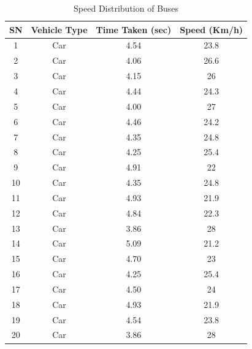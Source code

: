 \begin{table}[h!]
    \centering
    \caption{Speed Distribution of Buses}
    \begin{tabular}{|c|c|c|c|}
        \hline
        \textbf{SN}	& \textbf{Vehicle Type}	& \textbf{Time Taken (sec)}	& \textbf{Speed (Km/h)} \\ \hline
        1	&Car	&4.54	&23.8 \\ \hline
        2	&Car	&4.06	&26.6 \\ \hline
        3	&Car	&4.15	&26 \\ \hline
        4	&Car	&4.44	&24.3 \\ \hline
        5	&Car	&4.00	&27 \\ \hline
        6	&Car	&4.46	&24.2 \\ \hline
        7	&Car	&4.35	&24.8 \\ \hline
        8	&Car	&4.25	&25.4 \\ \hline
        9	&Car	&4.91	&22 \\ \hline
        10	&Car	&4.35	&24.8 \\ \hline
        11	&Car	&4.93	&21.9 \\ \hline
        12	&Car	&4.84	&22.3 \\ \hline
        13	&Car	&3.86	&28 \\ \hline
        14	&Car	&5.09	&21.2 \\ \hline
        15	&Car	&4.70	&23 \\ \hline
        16	&Car	&4.25	&25.4 \\ \hline
        17	&Car	&4.50	&24 \\ \hline
        18	&Car	&4.93	&21.9 \\ \hline
        19	&Car	&4.54	&23.8 \\ \hline
        20	&Car	&3.86	&28 \\ \hline


    \end{tabular}
\end{table}

